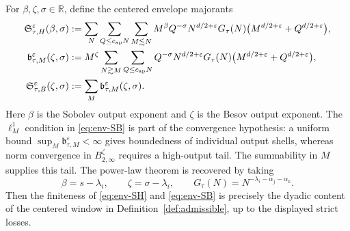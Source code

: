 \documentclass[11pt,reqno]{amsart}
\numberwithin{equation}{section}
\theoremstyle{plain}
\theoremstyle{definition}
\newcommand{\eps}{\varepsilon}
\begin{document}
For \(\beta,\zeta,\sigma\in\mathbb R\), define the centered envelope majorants
\begin{align}
\mathfrak S_{\tau,H}^{\eps}(\beta,\sigma)
&:=\sum_N\sum_{Q\le c_{\rm ap}N}\sum_{M\lesssim N}
        M^\beta Q^{-\sigma}
        N^{d/2+\eps}G_\tau(N)
        \bigl(M^{d/2+\eps}+Q^{d/2+\eps}\bigr), \label{eq:env-SH}\\
\mathfrak b_{\tau,M}^{\eps}(\zeta,\sigma)
&:= M^\zeta\sum_{N\gtrsim M}\sum_{Q\le c_{\rm ap}N}
        Q^{-\sigma}
        N^{d/2+\eps}G_\tau(N)
        \bigl(M^{d/2+\eps}+Q^{d/2+\eps}\bigr), \label{eq:env-bM}\\
\mathfrak S_{\tau,B}^{\eps}(\zeta,\sigma)
&:=\sum_M \mathfrak b_{\tau,M}^{\eps}(\zeta,\sigma). \label{eq:env-SB}
\end{align}
Here \(\beta\) is the Sobolev output exponent and \(\zeta\) is the Besov output exponent.  The \(\ell^1_M\) condition in \eqref{eq:env-SB} is part of the convergence hypothesis: a uniform bound \(\sup_M\mathfrak b_{\tau,M}^{\eps}<\infty\) gives boundedness of individual output shells, whereas norm convergence in \(B_{2,\infty}^\zeta\) requires a high-output tail.  The summability in \(M\) supplies this tail.  The power-law theorem is recovered by taking
\begin{equation}\label{eq:power-specialization}
        \beta=s-\lambda_i,
        \qquad
        \zeta=\sigma-\lambda_i,
        \qquad
        G_\tau(N)=N^{-\lambda_i-\alpha_j-\alpha_k}.
\end{equation}
Then the finiteness of \eqref{eq:env-SH} and \eqref{eq:env-SB} is precisely the dyadic content of the centered window in Definition~\ref{def:admissible}, up to the displayed strict losses.
\end{document}
